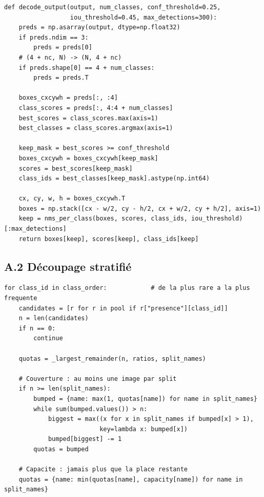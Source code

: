 \documentclass[11pt,a4paper]{article}
\begin{document}
\begin{lstlisting}[caption={Décodage d'un tenseur ONNX et NMS par classe (\texttt{src/inference/onnx\_detector.py}).}]
def decode_output(output, num_classes, conf_threshold=0.25,
                  iou_threshold=0.45, max_detections=300):
    preds = np.asarray(output, dtype=np.float32)
    if preds.ndim == 3:
        preds = preds[0]
    # (4 + nc, N) -> (N, 4 + nc)
    if preds.shape[0] == 4 + num_classes:
        preds = preds.T

    boxes_cxcywh = preds[:, :4]
    class_scores = preds[:, 4:4 + num_classes]
    best_scores = class_scores.max(axis=1)
    best_classes = class_scores.argmax(axis=1)

    keep_mask = best_scores >= conf_threshold
    boxes_cxcywh = boxes_cxcywh[keep_mask]
    scores = best_scores[keep_mask]
    class_ids = best_classes[keep_mask].astype(np.int64)

    cx, cy, w, h = boxes_cxcywh.T
    boxes = np.stack([cx - w/2, cy - h/2, cx + w/2, cy + h/2], axis=1)
    keep = nms_per_class(boxes, scores, class_ids, iou_threshold)[:max_detections]
    return boxes[keep], scores[keep], class_ids[keep]
\end{lstlisting}

\subsection{A.2 Découpage stratifié}

\begin{lstlisting}[caption={Allocation proportionnelle des classes rares (\texttt{src/data/dataset.py}).}]
for class_id in class_order:            # de la plus rare a la plus frequente
    candidates = [r for r in pool if r["presence"][class_id]]
    n = len(candidates)
    if n == 0:
        continue

    quotas = _largest_remainder(n, ratios, split_names)

    # Couverture : au moins une image par split
    if n >= len(split_names):
        bumped = {name: max(1, quotas[name]) for name in split_names}
        while sum(bumped.values()) > n:
            biggest = max((x for x in split_names if bumped[x] > 1),
                          key=lambda x: bumped[x])
            bumped[biggest] -= 1
        quotas = bumped

    # Capacite : jamais plus que la place restante
    quotas = {name: min(quotas[name], capacity[name]) for name in split_names}
\end{lstlisting}
\end{document}
